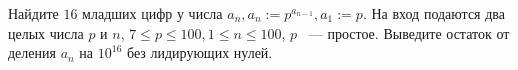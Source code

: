 Найдите $16$ младших цифр у числа $a_n, a_n := p^{a_{n-1}}, a_1 := p$.
\InputFile
На вход подаются два целых
числа $p$ и $n$, $7 \le p \le 100, 1 \le n \le 100$,
$p$ ~--- простое.
\OutputFile
Выведите остаток от деления $a_n$ на $10^{16}$ без лидирующих нулей.

